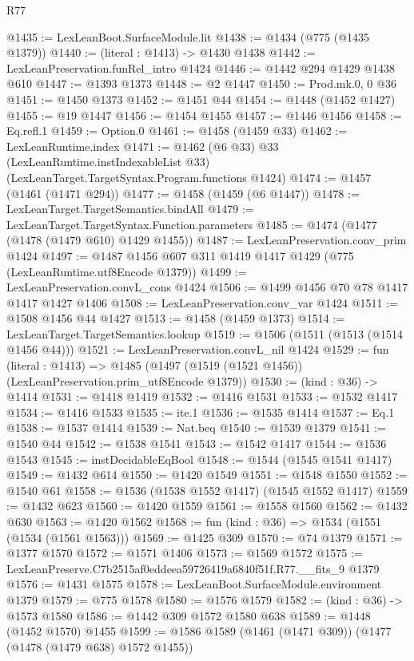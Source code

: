 \begin{lexlean}{R77}
\begin{coremodule}
{{@1435 := LexLeanBoot.SurfaceModule.lit
@1438 := @1434 (@775 (@1435 @1379))
@1440 := (literal : @1413) -> @1430 @1438
@1442 := LexLeanPreservation.funRel_intro @1424
@1446 := @1442 @294 @1429 @1438 @610
@1447 := @1393 @1373
@1448 := @2 @1447
@1450 := Prod.mk.{0, 0} @36
@1451 := @1450 @1373
@1452 := @1451 @44
@1454 := @1448 (@1452 @1427)
@1455 := @19 @1447
@1456 := @1454 @1455
@1457 := @1446 @1456
@1458 := Eq.refl.{1}
@1459 := Option.{0}
@1461 := @1458 (@1459 @33)
@1462 := LexLeanRuntime.index
@1471 := @1462
    (@6 @33)
    @33
    (LexLeanRuntime.instIndexableList @33)
    (LexLeanTarget.TargetSyntax.Program.functions @1424)
@1474 := @1457 (@1461 (@1471 @294))
@1477 := @1458 (@1459 (@6 @1447))
@1478 := LexLeanTarget.TargetSemantics.bindAll
@1479 := LexLeanTarget.TargetSyntax.Function.parameters
@1485 := @1474 (@1477 (@1478 (@1479 @610) @1429 @1455))
@1487 := LexLeanPreservation.conv_prim @1424
@1497 := @1487 @1456 @607 @311 @1419 @1417 @1429 (@775 (LexLeanRuntime.utf8Encode @1379))
@1499 := LexLeanPreservation.convL_cons @1424
@1506 := @1499 @1456 @70 @78 @1417 @1417 @1427 @1406
@1508 := LexLeanPreservation.conv_var @1424
@1511 := @1508 @1456 @44 @1427
@1513 := @1458 (@1459 @1373)
@1514 := LexLeanTarget.TargetSemantics.lookup
@1519 := @1506 (@1511 (@1513 (@1514 @1456 @44)))
@1521 := LexLeanPreservation.convL_nil @1424
@1529 := fun (literal : @1413) =>
  @1485 (@1497 (@1519 (@1521 @1456)) (LexLeanPreservation.prim_utf8Encode @1379))
@1530 := (kind : @36) -> @1414
@1531 := @1418 @1419
@1532 := @1416 @1531
@1533 := @1532 @1417
@1534 := @1416 @1533
@1535 := ite.{1}
@1536 := @1535 @1414
@1537 := Eq.{1}
@1538 := @1537 @1414
@1539 := Nat.beq
@1540 := @1539 @1379
@1541 := @1540 @44
@1542 := @1538 @1541
@1543 := @1542 @1417
@1544 := @1536 @1543
@1545 := instDecidableEqBool
@1548 := @1544 (@1545 @1541 @1417)
@1549 := @1432 @614
@1550 := @1420 @1549
@1551 := @1548 @1550
@1552 := @1540 @61
@1558 := @1536 (@1538 @1552 @1417) (@1545 @1552 @1417)
@1559 := @1432 @623
@1560 := @1420 @1559
@1561 := @1558 @1560
@1562 := @1432 @630
@1563 := @1420 @1562
@1568 := fun (kind : @36) => @1534 (@1551 (@1534 (@1561 @1563)))
@1569 := @1425 @309
@1570 := @74 @1379
@1571 := @1377 @1570
@1572 := @1571 @1406
@1573 := @1569 @1572
@1575 := LexLeanPreserve.C7b2515af0eddeea59726419a6840f51f.R77.__fits_9 @1379
@1576 := @1431 @1575
@1578 := LexLeanBoot.SurfaceModule.environment @1379
@1579 := @775 @1578
@1580 := @1576 @1579
@1582 := (kind : @36) -> @1573 @1580
@1586 := @1442 @309 @1572 @1580 @638
@1589 := @1448 (@1452 @1570) @1455
@1599 := @1586 @1589 (@1461 (@1471 @309)) (@1477 (@1478 (@1479 @638) @1572 @1455))
}}
\end{coremodule}
\end{lexlean}
